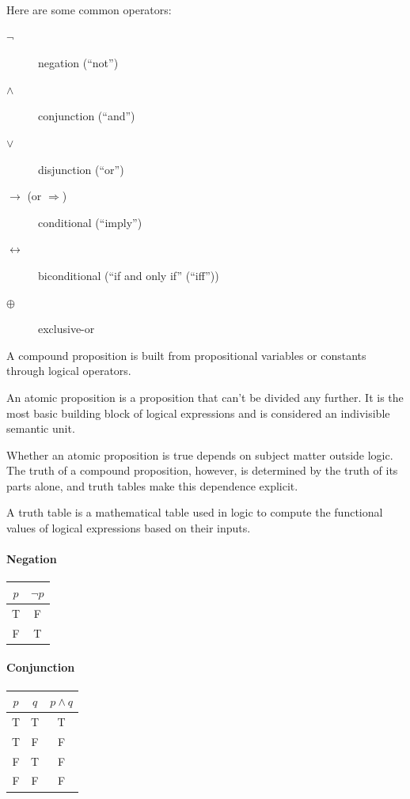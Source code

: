 Here are some common operators:
\begin{description}
    \item[$\neg$] negation (“not”)
    \item[$\wedge$] conjunction (“and”)
    \item[$\vee$] disjunction (“or”)
    \item[$\to$ (or $\Rightarrow$)] conditional (“imply”)
    \item[$\leftrightarrow$] biconditional (“if and only if” (“iff”))
    \item[$\oplus$] exclusive-or
\end{description}

\begin{definition}
A compound proposition is built from propositional variables or constants through logical operators.
\end{definition}

\begin{definition}
An atomic proposition is a proposition that can't be divided any further. It is the most basic building block of logical expressions and is considered an indivisible semantic unit.
\end{definition}

Whether an atomic proposition is true depends on subject matter outside logic. The truth of a compound proposition, however, is determined by the truth of its parts alone, and truth tables make this dependence explicit.

\begin{definition}
A truth table is a mathematical table used in logic to compute the functional values of logical expressions based on their inputs.
\end{definition}

\paragraph{Negation}
\begin{center}
\begin{tabular}{c|c}
\toprule
$p$ & $\neg p$ \\
\midrule
T & F \\
F & T \\
\bottomrule
\end{tabular}
\end{center}

\paragraph{Conjunction}
\begin{center}
\begin{tabular}{cc|c}
\toprule
$p$ & $q$ & $p \wedge q$ \\
\midrule
T & T & T \\
T & F & F \\
F & T & F \\
F & F & F \\
\bottomrule
\end{tabular}
\end{center}



